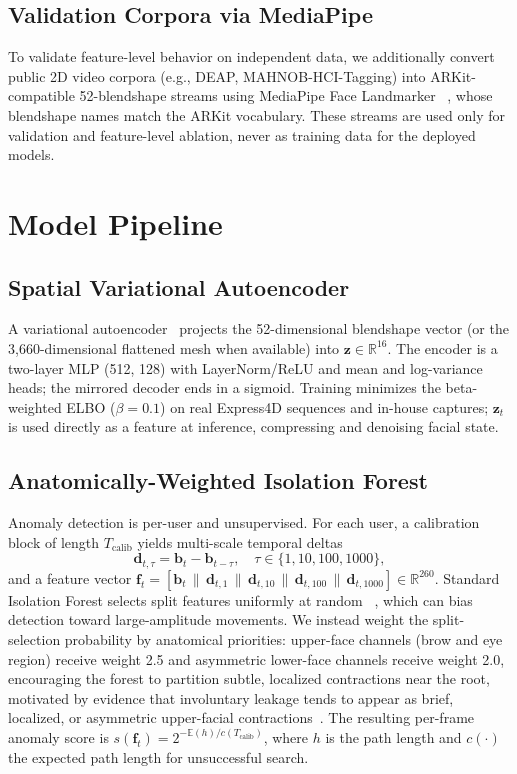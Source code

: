 \documentclass[sigconf]{acmart}
\begin{document}
\subsection{Validation Corpora via MediaPipe}
To validate feature-level behavior on independent data, we additionally
convert public 2D video corpora (e.g., DEAP, MAHNOB-HCI-Tagging) into
ARKit-compatible 52-blendshape streams using MediaPipe Face Landmarker
~\cite{kartynnik2019facemesh}, whose blendshape names match the ARKit
vocabulary. These streams are used only for validation and feature-level
ablation, never as training data for the deployed models.

\section{Model Pipeline}
\label{sec:models}

\subsection{Spatial Variational Autoencoder}
A variational autoencoder~\cite{kingma2014vae} projects the 52-dimensional
blendshape vector (or the 3,660-dimensional flattened mesh when available) into
$\mathbf{z} \in \mathbb{R}^{16}$. The encoder is a two-layer MLP (512, 128) with
LayerNorm/ReLU and mean and log-variance heads; the mirrored decoder ends in a
sigmoid. Training minimizes the beta-weighted ELBO ($\beta = 0.1$) on real
Express4D sequences and in-house captures; $\mathbf{z}_t$ is used directly as a
feature at inference, compressing and denoising facial state.

\subsection{Anatomically-Weighted Isolation Forest}
Anomaly detection is per-user and unsupervised. For each user, a calibration
block of length $T_{\text{calib}}$ yields multi-scale temporal deltas
$$\mathbf{d}_{t, \tau} = \mathbf{b}_t - \mathbf{b}_{t-\tau}, \quad
\tau \in \{1, 10, 100, 1000\},$$
and a feature vector
$\mathbf{f}_t = [\mathbf{b}_t \,\|\, \mathbf{d}_{t,1} \,\|\, \mathbf{d}_{t,10}
\,\|\, \mathbf{d}_{t,100} \,\|\, \mathbf{d}_{t,1000}] \in \mathbb{R}^{260}$.
Standard Isolation Forest selects split features uniformly at random
~\cite{liu2008isolation}, which can bias detection toward large-amplitude
movements. We instead weight the split-selection probability by anatomical
priorities: upper-face channels (brow and eye region) receive weight 2.5 and
asymmetric lower-face channels receive weight 2.0, encouraging the forest to
partition subtle, localized contractions near the root, motivated by evidence that involuntary leakage tends to appear as brief, localized, or asymmetric upper-facial contractions~\cite{porter2012secrets, vitale2021facial}. The resulting
per-frame anomaly score is $s(\mathbf{f}_t) = 2^{-\mathbb{E}(h)/c(T_{\text{calib}})}$,
where $h$ is the path length and $c(\cdot)$ the expected path length for
unsuccessful search.
\end{document}
